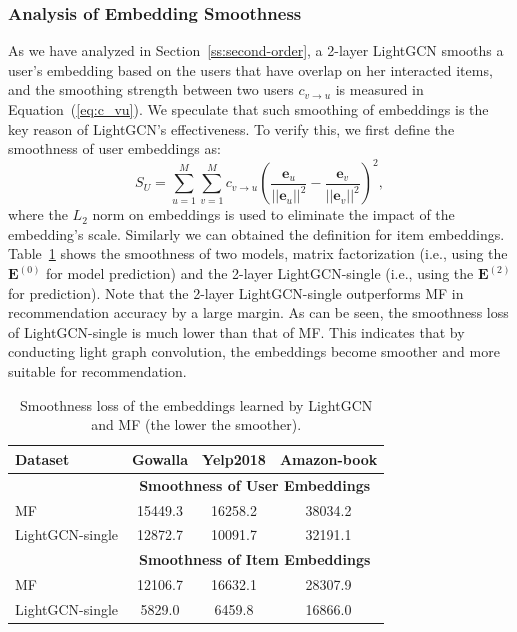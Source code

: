 \subsubsection{Analysis of Embedding Smoothness} 
As we have analyzed in Section~\ref{ss:second-order}, a 2-layer LightGCN smooths a user's embedding based on the users that have overlap on her interacted items, and the smoothing strength between two users $c_{v\to u}$ is measured in Equation~(\ref{eq:c_vu}). We speculate that such smoothing of embeddings is the key reason of LightGCN's effectiveness. To verify this, we first define the smoothness of user embeddings as:
\begin{equation}
    S_U = \sum_{u=1}^M \sum_{v=1}^M c_{v\to u} (\frac{\textbf{e}_{u}}{||\textbf{e}_{u}||^2} - \frac{\textbf{e}_{v}}{||\textbf{e}_{v}||^2})^2, 
\end{equation}
where the $L_2$ norm on embeddings is used to eliminate the impact of the embedding's scale. Similarly we can obtained the definition for item embeddings. 
Table~\ref{tab:Smoothness} shows the smoothness of two models, matrix factorization (i.e., using the $\textbf{E}^{(0)}$ for model prediction) and the 2-layer LightGCN-single (i.e., using the $\textbf{E}^{(2)}$ for prediction). 
Note that the 2-layer LightGCN-single outperforms MF in recommendation accuracy by a large margin. As can be seen, the smoothness loss of LightGCN-single is much lower than that of MF. This indicates that by conducting light graph convolution, the embeddings become smoother and more suitable for recommendation. 


\begin{table}[t]
\caption{Smoothness loss of the embeddings learned by LightGCN and MF (the lower the smoother).}\vspace{-8pt}
\label{tab:Smoothness}
\begin{tabular}{l|c|c|c}
\hline
\textbf{Dataset} & \multicolumn{1}{c|}{\textbf{Gowalla}} & \multicolumn{1}{c|}{\textbf{Yelp2018}} & \multicolumn{1}{c}{\textbf{Amazon-book}}\\ \hline
&\multicolumn{3}{c}{\textbf{Smoothness of User Embeddings}}\\ \hline
MF & 15449.3 & 16258.2 & 38034.2  \\ \hline
LightGCN-single & 12872.7 & 10091.7 & 32191.1 \\ \hline
&\multicolumn{3}{c}{\textbf{Smoothness of Item Embeddings}}\\ \hline
MF & 12106.7 & 16632.1 & 28307.9  \\ \hline
LightGCN-single & 5829.0 & 6459.8 & 16866.0 \\ \hline
\end{tabular}
\vspace{-5pt}
\end{table}

